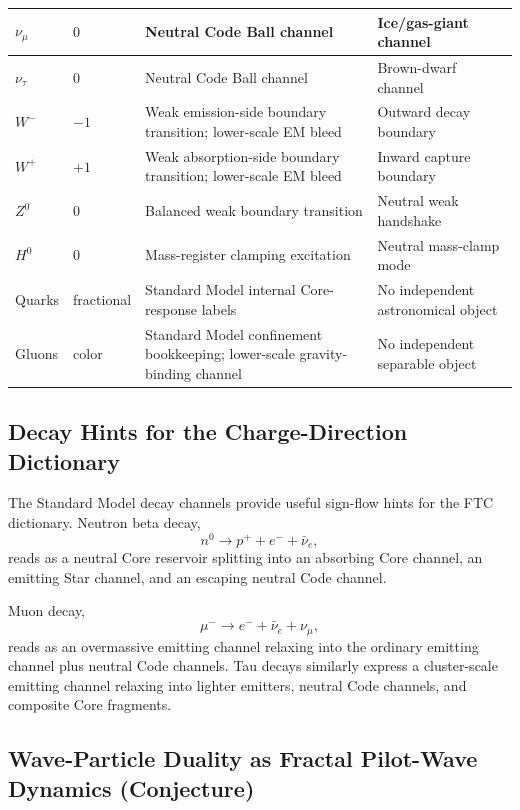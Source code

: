 \documentclass[11pt,a4paper]{article}
\begin{document}
\begin{center}
\begin{longtable}{|C{2.2cm}|C{1.5cm}|L{4.3cm}|L{5.2cm}|}
    \(\nu_\mu\) & \(0\) & Neutral Code Ball channel & Ice/gas-giant channel \\
    \hline
    \(\nu_\tau\) & \(0\) & Neutral Code Ball channel & Brown-dwarf channel \\
    \hline
    \(W^-\) & \(-1\) & Weak emission-side boundary transition; lower-scale EM bleed & Outward decay boundary \\
    \hline
    \(W^+\) & \(+1\) & Weak absorption-side boundary transition; lower-scale EM bleed & Inward capture boundary \\
    \hline
    \(Z^0\) & \(0\) & Balanced weak boundary transition & Neutral weak handshake \\
    \hline
    \(H^0\) & \(0\) & Mass-register clamping excitation & Neutral mass-clamp mode \\
    \hline
    Quarks & fractional & Standard Model internal Core-response labels & No independent astronomical object \\
    \hline
    Gluons & color & Standard Model confinement bookkeeping; lower-scale gravity-binding channel & No independent separable object \\
    \hline
    \end{longtable}
    \normalsize
    \end{center}

  \subsection{Decay Hints for the Charge-Direction Dictionary}

    The Standard Model decay channels provide useful sign-flow hints for the FTC dictionary. Neutron beta decay,
    \[
    n^0\rightarrow p^+ + e^- + \bar\nu_e,
    \]
    reads as a neutral Core reservoir splitting into an absorbing Core channel, an emitting Star channel, and an escaping neutral Code channel.

    Muon decay,
    \[
    \mu^-\rightarrow e^-+\bar\nu_e+\nu_\mu,
    \]
    reads as an overmassive emitting channel relaxing into the ordinary emitting channel plus neutral Code channels. Tau decays similarly express a cluster-scale emitting channel relaxing into lighter emitters, neutral Code channels, and composite Core fragments.

  \subsection{Wave-Particle Duality as Fractal Pilot-Wave Dynamics (Conjecture)}
\end{document}
